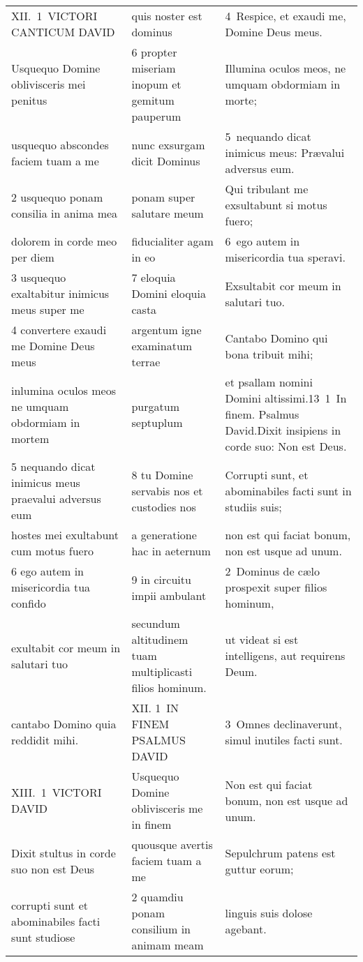 \documentclass{article}
\begin{document}
\begin{longtable}{@{}p{}p{}p{}@{}}
XII. 1 VICTORI CANTICUM DAVID	&	quis noster est dominus	&	4 Respice, et exaudi me, Domine Deus meus.	\\
Usquequo Domine oblivisceris mei penitus	&	6 propter miseriam inopum et gemitum pauperum	&	Illumina oculos meos, ne umquam obdormiam in morte;	\\
usquequo abscondes faciem tuam a me	&	nunc exsurgam dicit Dominus	&	5 nequando dicat inimicus meus: Prævalui adversus eum.	\\
2 usquequo ponam consilia in anima mea	&	ponam super salutare meum	&	Qui tribulant me exsultabunt si motus fuero;	\\
dolorem in corde meo per diem	&	fiducialiter agam in eo	&	6 ego autem in misericordia tua speravi.	\\
3 usquequo exaltabitur inimicus meus super me	&	7 eloquia Domini eloquia casta	&	Exsultabit cor meum in salutari tuo.	\\
4 convertere exaudi me Domine Deus meus	&	argentum igne examinatum terrae	&	Cantabo Domino qui bona tribuit mihi;	\\
inlumina oculos meos ne umquam obdormiam in mortem	&	purgatum septuplum	&	et psallam nomini Domini altissimi.13 1 In finem. Psalmus David.Dixit insipiens in corde suo: Non est Deus.	\\
5 nequando dicat inimicus meus praevalui adversus eum	&	8 tu Domine servabis nos et custodies nos	&	Corrupti sunt, et abominabiles facti sunt in studiis suis;	\\
hostes mei exultabunt cum motus fuero	&	a generatione hac in aeternum	&	non est qui faciat bonum, non est usque ad unum.	\\
6 ego autem in misericordia tua confido	&	9 in circuitu impii ambulant	&	2 Dominus de cælo prospexit super filios hominum,	\\
exultabit cor meum in salutari tuo	&	secundum altitudinem tuam multiplicasti filios hominum.	&	ut videat si est intelligens, aut requirens Deum.	\\
cantabo Domino quia reddidit mihi.	&	XII. 1 IN FINEM PSALMUS DAVID	&	3 Omnes declinaverunt, simul inutiles facti sunt.	\\
XIII. 1 VICTORI DAVID	&	Usquequo Domine oblivisceris me in finem	&	Non est qui faciat bonum, non est usque ad unum.	\\
Dixit stultus in corde suo non est Deus	&	quousque avertis faciem tuam a me	&	Sepulchrum patens est guttur eorum;	\\
corrupti sunt et abominabiles facti sunt studiose	&	2 quamdiu ponam consilium in animam meam	&	linguis suis dolose agebant.	\\

\end{longtable}
\end{document}

